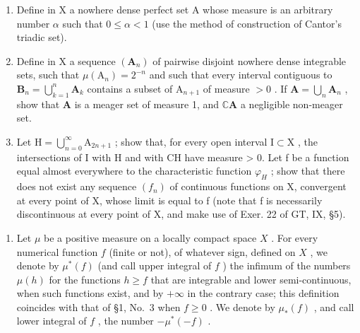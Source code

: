 \begin{enumerate}
\def\labelenumi{\alph{enumi})}
\item
  Define in X a nowhere dense perfect set A whose measure is an arbitrary number \(\alpha\) such that \(0 \leqslant \alpha < 1\) (use the method of construction of Cantor's triadic set).
\item
  Define in X a sequence \((\mathbf{A}_n)\) of pairwise disjoint nowhere dense integrable sets, such that \(\mu (\mathrm{A}_n) = 2^{-n}\) and such that every interval contiguous to \(\mathbf{B}_n = \bigcup_{k = 1}^{n}\mathbf{A}_k\) contains a subset of \(\mathrm{A}_{n + 1}\) of measure \(>0\) . If \(\mathbf{A} = \bigcup_{n}\mathbf{A}_n\) , show that \(\mathbf{A}\) is a meager set of measure 1, and \(\mathbb{C}\mathbf{A}\) a negligible non-meager set.
\item
  Let \(\mathrm{H} = \bigcup_{n=0}^{\infty} \mathrm{A}_{2n+1}\) ; show that, for every open interval \(\mathrm{I} \subset \mathrm{X}\) , the intersections of I with H and with CH have measure \textgreater{} 0. Let f be a function equal almost everywhere to the characteristic function \(\varphi_{H}\) ; show that there does not exist any sequence \((f_{n})\) of continuous functions on X, convergent at every point of X, whose limit is equal to f (note that f is necessarily discontinuous at every point of X, and make use of Exer. 22 of GT, IX, §5).
\end{enumerate}

\begin{enumerate}
\def\labelenumi{\arabic{enumi})}
\setcounter{enumi}{4}
\tightlist
\item
  Let \(\mu\) be a positive measure on a locally compact space \(X\) . For every numerical function \(f\) (finite or not), of whatever sign, defined on \(X\) , we denote by \(\mu^{*}(f)\) (and call upper integral of \(f\) ) the infimum of the numbers \(\mu(h)\) for the functions \(h \geqslant f\) that are integrable and lower semi-continuous, when such functions exist, and by \(+\infty\) in the contrary case; this definition coincides with that of §1, No.~3 when \(f \geqslant 0\) . We denote by \(\mu_{*}(f)\) , and call lower integral of \(f\) , the number \(-\mu^{*}(-f)\) .
\end{enumerate}

